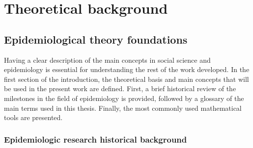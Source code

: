 \chapter{Theoretical background}

\section{Epidemiological theory foundations}

Having a clear description of the main concepts in social science and epidemiology is essential for understanding the rest of the work developed. In the first section of the introduction, the theoretical basis and main concepts that will be used in the present work are defined. First, a brief historical review of the milestones in the field of epidemiology is provided, followed by a glossary of the main terms used in this thesis. Finally, the most commonly used mathematical tools are presented.
\subsection{ Epidemiologic research historical background}

